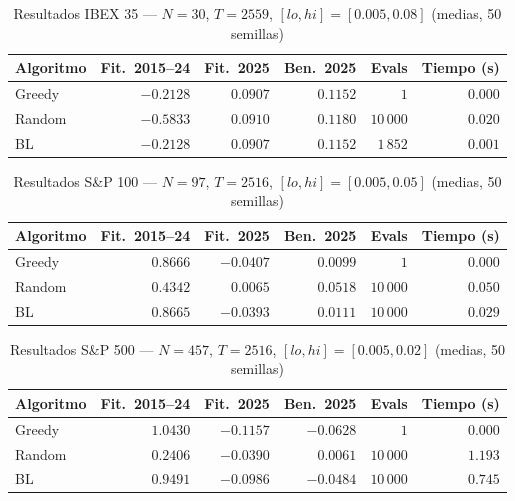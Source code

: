\documentclass[12pt,a4paper]{article}
\begin{document}
\begin{table}[H]
\centering
\caption{Resultados IBEX 35 --- $N=30$, $T=2559$, $[lo,hi]=[0.005, 0.08]$ (medias, 50 semillas)}
\begin{tabular}{lrrrrr}
\toprule
\textbf{Algoritmo} & \textbf{Fit.\ 2015--24} & \textbf{Fit.\ 2025} & \textbf{Ben.\ 2025} & \textbf{Evals} & \textbf{Tiempo (s)} \\
\midrule
Greedy  & $-0.2128$ & $0.0907$ & $0.1152$ & $1$         & $0.000$ \\
Random  & $-0.5833$ & $0.0910$ & $0.1180$ & $10\,000$   & $0.020$ \\
BL      & $-0.2128$ & $0.0907$ & $0.1152$ & $1\,852$  & $0.001$ \\
\bottomrule
\end{tabular}
\end{table}

\begin{table}[H]
\centering
\caption{Resultados S\&P 100 --- $N=97$, $T=2516$, $[lo,hi]=[0.005, 0.05]$ (medias, 50 semillas)}
\begin{tabular}{lrrrrr}
\toprule
\textbf{Algoritmo} & \textbf{Fit.\ 2015--24} & \textbf{Fit.\ 2025} & \textbf{Ben.\ 2025} & \textbf{Evals} & \textbf{Tiempo (s)} \\
\midrule
Greedy  & $0.8666$ & $-0.0407$ & $0.0099$ & $1$         & $0.000$ \\
Random  & $0.4342$ & $0.0065$  & $0.0518$ & $10\,000$   & $0.050$ \\
BL      & $0.8665$ & $-0.0393$ & $0.0111$ & $10\,000$   & $0.029$ \\
\bottomrule
\end{tabular}
\end{table}

\begin{table}[H]
\centering
\caption{Resultados S\&P 500 --- $N=457$, $T=2516$, $[lo,hi]=[0.005, 0.02]$ (medias, 50 semillas)}
\begin{tabular}{lrrrrr}
\toprule
\textbf{Algoritmo} & \textbf{Fit.\ 2015--24} & \textbf{Fit.\ 2025} & \textbf{Ben.\ 2025} & \textbf{Evals} & \textbf{Tiempo (s)} \\
\midrule
Greedy  & $1.0430$ & $-0.1157$ & $-0.0628$ & $1$         & $0.000$ \\
Random  & $0.2406$ & $-0.0390$  & $0.0061$  & $10\,000$   & $1.193$ \\
BL      & $0.9491$ & $-0.0986$ & $-0.0484$ & $10\,000$   & $0.745$ \\
\bottomrule
\end{tabular}
\end{table}
\end{document}
